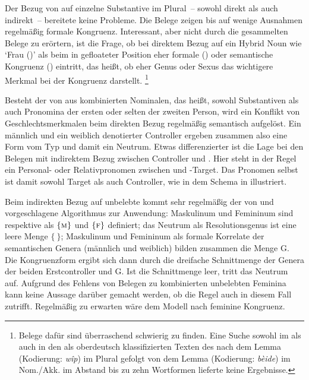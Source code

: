 Der Bezug von  auf einzelne Substantive im Plural~-- sowohl direkt
als auch indirekt~-- bereitete keine Probleme. Die Belege zeigen bis auf wenige
Ausnahmen regelmäßig formale Kongruenz. Interessant, aber
nicht durch die gesammelten Belege zu erörtern, ist die Frage, ob bei direktem
Bezug auf ein Hybrid Noun wie  `Frau (\NeutF)' als 
beim  in gefloateter Position eher formale
() oder semantische Kongruenz ()
eintritt, das heißt, ob eher Genus oder Sexus
das wichtigere Merkmal bei der Kongruenz darstellt.%
%
	\footnote{Belege dafür sind überraschend schwierig zu finden. Eine Suche
		sowohl im \CAO{} als auch in den als oberdeutsch klassifizierten Texten
		des \REM{} nach dem Lemma  (Kodierung: \emph{wîp}) im Plural
		gefolgt von dem Lemma  (Kodierung: \emph{bèide}) im
		Nom./Akk. im Abstand bis zu zehn Wortformen lieferte keine Ergebnisse.}

Besteht der  von  aus kombinierten Nominalen, das
heißt, sowohl Substantiven als auch
Pronomina der ersten oder selten der zweiten Person, wird
ein Konflikt von Geschlechtsmerkmalen beim direkten Bezug
regelmäßig semantisch aufgelöst. Ein männlich und ein weiblich
denotierter Controller ergeben zusammen also eine Form vom Typ
 und damit ein Neutrum. Etwas differenzierter ist die Lage bei den
Belegen mit indirektem Bezug zwischen Controller und . Hier steht
in der Regel ein Personal- oder Relativpronomen zwischen
 und -Target. Das Pronomen selbst ist damit
sowohl Target als auch Controller, wie in dem Schema in
 illustriert.

Beim indirekten Bezug auf unbelebte  kommt
sehr regelmäßig der von \citet[577]{wechsler2009} und
\citet[184]{wechslerzlatic2003} vorgeschlagene Algorithmus zur Anwendung:
Maskulinum und Femininum sind respektive als $\{\textsc{m}\}$ und
$\{\textsc{f}\}$ definiert; das Neutrum als Resolutionsgenus ist eine leere Menge $\{\ \}$; Maskulinum und Femininum als formale
Korrelate der semantischen Genera (männlich und weiblich) bilden
zusammen die Menge G. Die Kongruenzform ergibt sich dann durch die
dreifache Schnittmenge der Genera der beiden Erstcontroller und G. Ist
die Schnittmenge leer, tritt das Neutrum auf. Aufgrund des Fehlens von Belegen
zu kombinierten unbelebten Feminina kann keine Aussage darüber gemacht werden,
ob die Regel auch in diesem Fall zutrifft. Regelmäßig zu erwarten wäre dem
Modell nach feminine Kongruenz.

